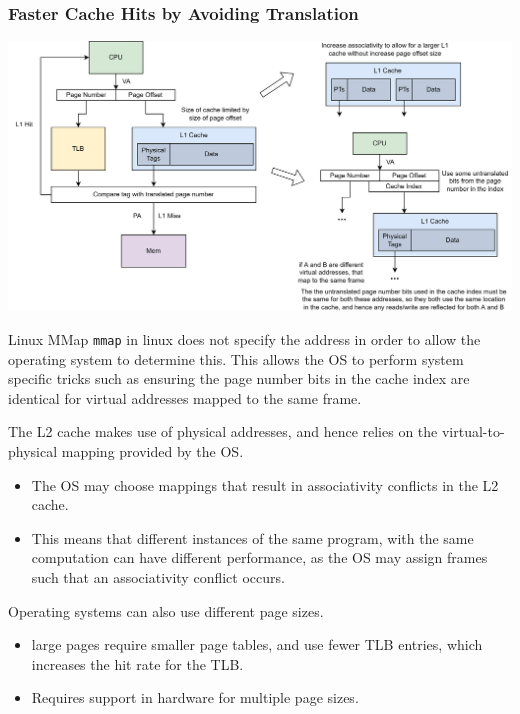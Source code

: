 \subsubsection{Faster Cache Hits by Avoiding Translation}
\begin{center}
	\includegraphics[width=\textwidth]{caches/images/fast_cache_hit_index_offset_bits.drawio.png}
\end{center}
\begin{sidenotebox}{Linux MMap}
	\texttt{mmap} in linux does not specify the address in order to allow the operating system to determine this. This allows the OS to perform system specific tricks such as ensuring the page number bits in the cache index are identical for virtual addresses mapped to the same frame.
\end{sidenotebox}
The L2 cache makes use of physical addresses, and hence relies on the virtual-to-physical mapping provided by the OS.
\begin{itemize}
	\item The OS may choose mappings that result in associativity conflicts in the L2 cache.
	\item This means that different instances of the same program, with the same computation can have different performance, as the OS may assign frames such that an associativity conflict occurs.
\end{itemize}
Operating systems can also use different page sizes.
\begin{itemize}
	\item large pages require smaller page tables, and use fewer TLB entries, which increases the hit rate for the TLB.
	\item Requires support in hardware for multiple page sizes.
\end{itemize}
